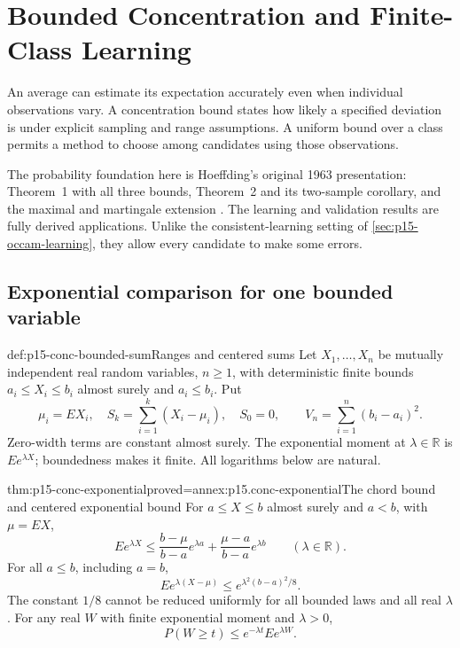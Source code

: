 \chapter{Bounded Concentration and Finite-Class Learning}
\label{sec:p15-bounded-concentration-learning}

An average can estimate its expectation accurately even when individual
observations vary. A concentration bound states how likely a specified
deviation is under explicit sampling and range assumptions. A uniform
bound over a class permits a method to choose among candidates using
those observations.

The probability foundation here is Hoeffding's original 1963 presentation:
Theorem~1 with all three bounds, Theorem~2 and its two-sample corollary,
and the maximal and martingale extension
\cite[pp.~13--23]{Hoeffding1963BoundedSums}.
The learning and validation results are fully derived applications.
Unlike the consistent-learning setting of \cref{sec:p15-occam-learning},
they allow every candidate to make some errors.

\section{Exponential comparison for one bounded variable}

\begin{hbdefinition}{def:p15-conc-bounded-sum}{Ranges and centered sums}
Let \(X_1,\ldots,X_n\) be mutually independent real random variables,
\(n\geq1\), with deterministic finite bounds
\(a_i\leq X_i\leq b_i\) almost surely and \(a_i\leq b_i\).
Put
\[
 \mu_i=EX_i,\quad S_k=\sum_{i=1}^k(X_i-\mu_i),\quad S_0=0,
 \qquad V_n=\sum_{i=1}^n(b_i-a_i)^2.
\]
Zero-width terms are constant almost surely.
The exponential moment at \(\lambda\in\mathbb R\) is
\(E e^{\lambda X}\); boundedness makes it finite.
All logarithms below are natural.
\end{hbdefinition}

\begin{hblemma}{thm:p15-conc-exponential}{proved=annex:p15.conc-exponential}{The chord bound and centered exponential bound}
For \(a\leq X\leq b\) almost surely and \(a<b\), with \(\mu=EX\),
\[
 E e^{\lambda X}
   \leq\frac{b-\mu}{b-a}e^{\lambda a}
          +\frac{\mu-a}{b-a}e^{\lambda b}
                  \qquad(\lambda\in\mathbb R).
\]
For all \(a\leq b\), including \(a=b\),
\[
                     E e^{\lambda(X-\mu)}
                        \leq e^{\lambda^2(b-a)^2/8}.
\]
The constant \(1/8\) cannot be reduced uniformly for all bounded
laws and all real \(\lambda\).
For any real \(W\) with finite exponential moment and
\(\lambda>0\),
\[
                         P(W\geq t)\leq e^{-\lambda t}Ee^{\lambda W}.
\]
\end{hblemma}

